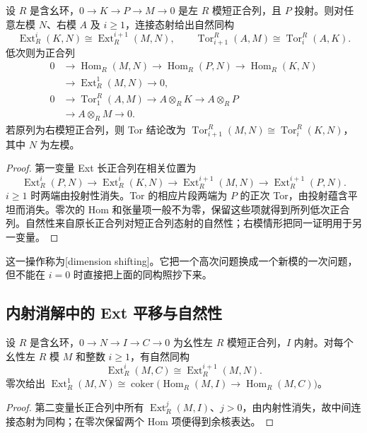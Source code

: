 \begin{theorem}[基础维数平移]\label{b4:thm:dimension-shift-basic}
设 \(R\) 是含幺环，\(0\to K\to P\to M\to0\) 是左 \(R\) 模短正合列，且 \(P\) 投射。则对任意左模 \(N\)、右模 \(A\) 及 \(i\ge1\)，连接态射给出自然同构
\[
\operatorname{Ext}_R^i(K,N)\cong\operatorname{Ext}_R^{i+1}(M,N),
\qquad
\operatorname{Tor}_{i+1}^R(A,M)\cong\operatorname{Tor}_i^R(A,K).
\]
低次则为正合列
\[
\begin{aligned}
0&\longrightarrow\operatorname{Hom}_R(M,N)\longrightarrow\operatorname{Hom}_R(P,N)
\longrightarrow\operatorname{Hom}_R(K,N)\\
&\longrightarrow\operatorname{Ext}_R^1(M,N)\longrightarrow0,\\
0&\longrightarrow\operatorname{Tor}_1^R(A,M)\longrightarrow A\otimes_RK
\longrightarrow A\otimes_RP\\
&\longrightarrow A\otimes_RM\longrightarrow0.
\end{aligned}
\]
若原列为右模短正合列，则 Tor 结论改为 \(\operatorname{Tor}_{i+1}^R(M,N)\cong\operatorname{Tor}_i^R(K,N)\)，其中 \(N\) 为左模。
\end{theorem}
\begin{proof}
第一变量 Ext 长正合列在相关位置为
\[
\operatorname{Ext}_R^i(P,N)\longrightarrow\operatorname{Ext}_R^i(K,N)
\longrightarrow\operatorname{Ext}_R^{i+1}(M,N)
\longrightarrow\operatorname{Ext}_R^{i+1}(P,N).
\]
\(i\ge1\) 时两端由投射性消失。Tor 的相应片段两端为 \(P\) 的正次 Tor，由投射蕴含平坦而消失。零次的 Hom 和张量项一般不为零，保留这些项就得到所列低次正合列。自然性来自原长正合列对短正合列态射的自然性；右模情形把同一证明用于另一变量。
\end{proof}

这一操作称为[dimension shifting]。它把一个高次问题换成一个新模的一次问题，但不能在 \(i=0\) 时直接把上面的同构照抄下来。

\subsection{内射消解中的 Ext 平移与自然性}
\label{b4:subsec:0805:02}

\begin{proposition}\label{b4:prop:injective-dimension-shift}
设 \(R\) 是含幺环，\(0\to N\to I\to C\to0\) 为幺性左 \(R\) 模短正合列，\(I\) 内射。对每个幺性左 \(R\) 模 \(M\) 和整数 \(i\ge1\)，有自然同构
\[
\operatorname{Ext}_R^i(M,C)\cong\operatorname{Ext}_R^{i+1}(M,N).
\]
零次给出 \(\operatorname{Ext}_R^1(M,N)\cong
\operatorname{coker}\bigl(\operatorname{Hom}_R(M,I)\to\operatorname{Hom}_R(M,C)\bigr)\)。
\end{proposition}
\begin{proof}
第二变量长正合列中所有 \(\operatorname{Ext}_R^j(M,I)\)、\(j>0\)，由内射性消失，故中间连接态射为同构；在零次保留两个 Hom 项便得到余核表达。
\end{proof}

